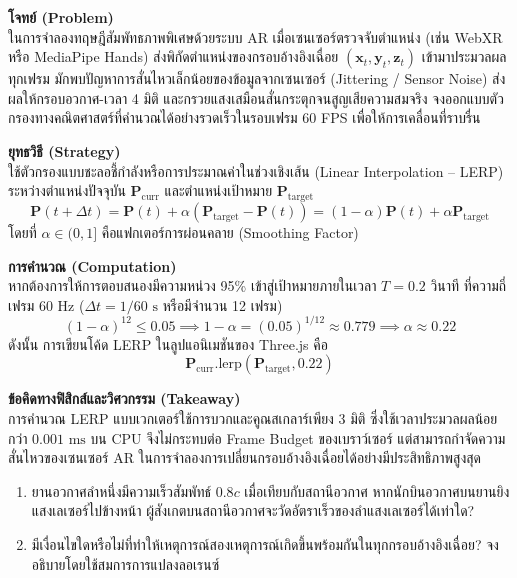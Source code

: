\begin{psctexample}
\textbf{โจทย์ (Problem)} \\
ในการจำลองทฤษฎีสัมพัทธภาพพิเศษด้วยระบบ AR เมื่อเซนเซอร์ตรวจจับตำแหน่ง (เช่น WebXR หรือ MediaPipe Hands) ส่งพิกัดตำแหน่งของกรอบอ้างอิงเฉื่อย $(\mathbf{x}_t, \mathbf{y}_t, \mathbf{z}_t)$ เข้ามาประมวลผลทุกเฟรม มักพบปัญหาการสั่นไหวเล็กน้อยของข้อมูลจากเซนเซอร์ (Jittering / Sensor Noise) ส่งผลให้กรอบอวกาศ-เวลา 4 มิติ และกรวยแสงเสมือนสั่นกระตุกจนสูญเสียความสมจริง จงออกแบบตัวกรองทางคณิตศาสตร์ที่คำนวณได้อย่างรวดเร็วในรอบเฟรม 60 FPS เพื่อให้การเคลื่อนที่ราบรื่น

\textbf{ยุทธวิธี (Strategy)} \\
ใช้ตัวกรองแบบชะลอชี้กำลังหรือการประมาณค่าในช่วงเชิงเส้น (Linear Interpolation -- LERP) ระหว่างตำแหน่งปัจจุบัน $\mathbf{P}_{\text{curr}}$ และตำแหน่งเป้าหมาย $\mathbf{P}_{\text{target}}$
\begin{equation}
\mathbf{P}(t + \Delta t) = \mathbf{P}(t) + \alpha \left( \mathbf{P}_{\text{target}} - \mathbf{P}(t) \right) = (1 - \alpha)\mathbf{P}(t) + \alpha \mathbf{P}_{\text{target}}
\end{equation}
โดยที่ $\alpha \in (0, 1]$ คือแฟกเตอร์การผ่อนคลาย (Smoothing Factor)

\textbf{การคำนวณ (Computation)} \\
หากต้องการให้การตอบสนองมีความหน่วง 95\% เข้าสู่เป้าหมายภายในเวลา $T = 0.2\text{ วินาที}$ ที่ความถี่เฟรม $60\text{ Hz}$ ($\Delta t = 1/60\text{ s}$ หรือมีจำนวน 12 เฟรม)
\begin{equation}
(1 - \alpha)^{12} \le 0.05 \implies 1 - \alpha = (0.05)^{1/12} \approx 0.779 \implies \alpha \approx 0.22
\end{equation}
ดังนั้น การเขียนโค้ด LERP ในลูปแอนิเมชันของ Three.js คือ
\begin{equation}
\mathbf{P}_{\text{curr}}.\text{lerp}(\mathbf{P}_{\text{target}}, 0.22)
\end{equation}

\textbf{ข้อคิดทางฟิสิกส์และวิศวกรรม (Takeaway)} \\
การคำนวณ LERP แบบเวกเตอร์ใช้การบวกและคูณสเกลาร์เพียง 3 มิติ ซึ่งใช้เวลาประมวลผลน้อยกว่า $0.001\text{ ms}$ บน CPU จึงไม่กระทบต่อ Frame Budget ของเบราว์เซอร์ แต่สามารถกำจัดความสั่นไหวของเซนเซอร์ AR ในการจำลองการเปลี่ยนกรอบอ้างอิงเฉื่อยได้อย่างมีประสิทธิภาพสูงสุด
\qedexam
\end{psctexample}

\begin{conceptcheck}[คำถามทบทวนแนวคิด]
\begin{enumerate}
    \item ยานอวกาศลำหนึ่งมีความเร็วสัมพัทธ์ $0.8c$ เมื่อเทียบกับสถานีอวกาศ หากนักบินอวกาศบนยานยิงแสงเลเซอร์ไปข้างหน้า ผู้สังเกตบนสถานีอวกาศจะวัดอัตราเร็วของลำแสงเลเซอร์ได้เท่าใด?
    \item มีเงื่อนไขใดหรือไม่ที่ทำให้เหตุการณ์สองเหตุการณ์เกิดขึ้นพร้อมกันในทุกกรอบอ้างอิงเฉื่อย? จงอธิบายโดยใช้สมการการแปลงลอเรนซ์
\end{enumerate}
\end{conceptcheck}

